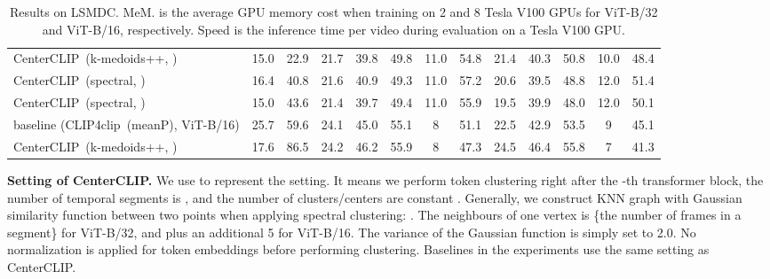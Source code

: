 \documentclass[sigconf]{acmart}
\begin{document}
\begin{table*}[t]
{\begin{tabular}{lcc|ccccc|ccccc}
			CenterCLIP~(k-medoids++, )
			& \cellcolor{Gray}15.0 & \cellcolor{Gray}22.9 
			& 21.7 & 39.8 & 49.8 & 11.0 & 54.8 
			& 21.4 & 40.3 & 50.8 & 10.0 & 48.4 	  \\
			
			CenterCLIP~(spectral, )
			& 16.4 & 40.8 
			& 21.6 & 40.9 & 49.3 & 11.0 & 57.2 
			& 20.6 & 39.5 & 48.8 & 12.0 & 51.4 \\
			
			CenterCLIP~(spectral, )
			& 15.0 & 43.6 
			& 21.4 & 39.7 & 49.4 & 11.0 & 55.9
			& 19.5 & 39.9 & 48.0 & 12.0 & 50.1  \\
			\midrule
			
			baseline (CLIP4clip~(meanP), ViT-B/16)
			& 25.7 & 59.6
			& 24.1 & 45.0 & 55.1 & 8 & 51.1
			& 22.5 & 42.9 & 53.5 & 9 & 45.1 \\			
			
			CenterCLIP~(k-medoids++, )
			& 17.6 & 86.5 
			& \cellcolor{Gray}24.2 & \cellcolor{Gray}46.2 & \cellcolor{Gray}55.9 & \cellcolor{Gray}8 &  \cellcolor{Gray}47.3 
			& \cellcolor{Gray}24.5 & \cellcolor{Gray}46.4 & \cellcolor{Gray}55.8 & \cellcolor{Gray}7 & \cellcolor{Gray}41.3 \\
			\bottomrule
		\end{tabular}
	}
	\caption{ Results on LSMDC. 
		MeM. is the average GPU memory cost when training on 2 and 8 Tesla V100 GPUs for ViT-B/32 and ViT-B/16, respectively.
		Speed is the inference time per video during evaluation on a Tesla V100 GPU. 
	}
	\label{tab:result_LSMDC}
\end{table*}


\noindent
\textbf{Setting of CenterCLIP.}
We use {\color{blue} {}} to represent the setting.
It means we perform token clustering right after the -th transformer
block, the number of temporal segments is ,
and the number of clusters/centers
are constant .
Generally, we construct KNN graph with Gaussian similarity function
between two points when applying spectral clustering: .
The neighbours of one vertex is  \{the number of frames in a segment\} for ViT-B/32,
and plus an additional 5 for ViT-B/16.
The variance of the Gaussian function  is simply set to 2.0.
No normalization is applied for token embeddings before performing clustering.
Baselines in the
experiments use the same setting
as CenterCLIP.
\end{document}
